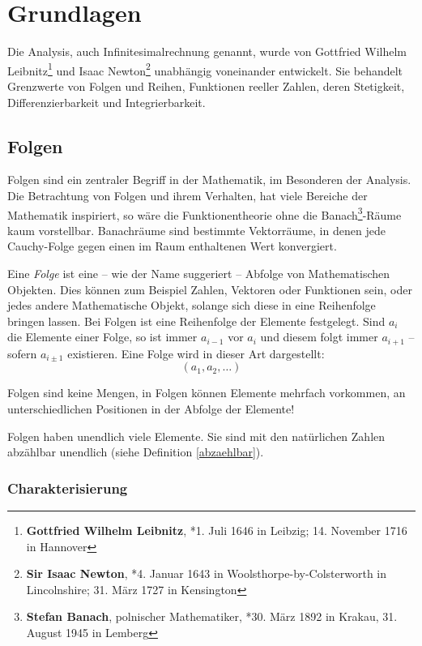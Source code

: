 
\chapter{Grundlagen}

Die Analysis, auch Infinitesimalrechnung genannt, wurde von Gottfried Wilhelm Leibnitz\footnote{\textbf{Gottfried Wilhelm Leibnitz}, *1. Juli 1646 in Leibzig; 14. November 1716 in Hannover} und Isaac Newton\footnote{\textbf{Sir Isaac Newton}, *4. Januar 1643 in Woolsthorpe-by-Colsterworth in Lincolnshire; 31. März 1727 in Kensington} unabhängig voneinander entwickelt. Sie behandelt Grenzwerte von Folgen und Reihen, Funktionen reeller Zahlen, deren Stetigkeit, Differenzierbarkeit und Integrierbarkeit. 

\section{Folgen}

Folgen sind ein zentraler Begriff in der Mathematik, im Besonderen der Analysis. Die Betrachtung von Folgen und ihrem Verhalten, hat viele Bereiche der Mathematik inspiriert, so wäre die Funktionentheorie ohne die Banach\footnote{\textbf{Stefan Banach}, polnischer Mathematiker,  *30. März 1892 in Krakau, 31. August 1945 in Lemberg}-Räume kaum vorstellbar.  Banachräume sind bestimmte Vektorräume, in denen jede Cauchy-Folge gegen einen im Raum enthaltenen Wert konvergiert.

\begin{definition}
Eine \textsl{Folge} ist eine -- wie der Name suggeriert -- Abfolge von Mathematischen Objekten. Dies können zum Beispiel Zahlen, Vektoren oder Funktionen sein, oder jedes andere Mathematische Objekt, solange sich diese in eine Reihenfolge bringen lassen. Bei Folgen ist eine Reihenfolge der Elemente festgelegt. Sind $a_i$ die Elemente einer Folge, so ist immer $a_{i-1}$ vor $a_i$ und diesem folgt immer $a_{i+1}$ -- sofern $a_{i\pm 1}$ existieren. Eine Folge wird in dieser Art dargestellt:
\[
(a_1, a_2, \dots)
\]
\end{definition}

Folgen sind keine Mengen, in Folgen können Elemente mehrfach vorkommen, an unterschiedlichen Positionen in der Abfolge der Elemente! 

Folgen haben unendlich viele Elemente. Sie sind mit den natürlichen Zahlen abzählbar unendlich (siehe Definition \ref{abzaehlbar}).

\subsection{Charakterisierung}

